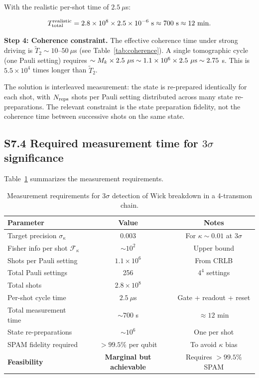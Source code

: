 \documentclass[prd,aps,showpacs,superscriptaddress,twocolumn]{revtex4-2}
\begin{document}
With the realistic per-shot time of $2.5\ \mu$s:

\begin{equation}
T_{\rm total}^{\rm realistic} = 2.8 \times 10^8 \times 2.5 \times 10^{-6}\ {\rm s} \approx 700\ {\rm s} \approx 12\ {\rm min}.
\label{eq:T_total_realistic}
\end{equation}

\textbf{Step 4: Coherence constraint.} The effective coherence time under strong driving is $\tilde{T}_2 \sim 10$--$50\ \mu$s (see Table~\ref{tab:coherence}). A single tomographic cycle (one Pauli setting) requires $\sim M_k \times 2.5\ \mu{\rm s} \sim 1.1 \times 10^6 \times 2.5\ \mu{\rm s} \sim 2.75$ s. This is $5.5 \times 10^4$ times longer than $\tilde{T}_2$.

The solution is interleaved measurement: the state is re-prepared identically for each shot, with $N_{\rm reps}$ shots per Pauli setting distributed across many state re-preparations. The relevant constraint is the state preparation fidelity, not the coherence time between successive shots on the same state.

\subsection{S7.4 Required measurement time for $3\sigma$ significance}

Table~\ref{tab:qubit_3sigma} summarizes the measurement requirements.

\begin{table}[h]
\centering
\caption{Measurement requirements for $3\sigma$ detection of Wick breakdown in a 4-transmon chain.}
\label{tab:qubit_3sigma}
\begin{tabular}{lcc}
\toprule
\textbf{Parameter} & \textbf{Value} & \textbf{Notes} \\
\midrule
Target precision $\sigma_\kappa$ & 0.003 & For $\kappa \sim 0.01$ at $3\sigma$ \\
Fisher info per shot $\mathcal{F}_\kappa$ & $\sim 10^2$ & Upper bound \\
Shots per Pauli setting & $1.1 \times 10^6$ & From CRLB \\
Total Pauli settings & 256 & $4^4$ settings \\
Total shots & $2.8 \times 10^8$ & \\
Per-shot cycle time & $2.5\ \mu$s & Gate + readout + reset \\
Total measurement time & $\sim 700$ s & $\approx 12$ min \\
State re-preparations & $\sim 10^6$ & One per shot \\
SPAM fidelity required & $> 99.5\%$ per qubit & To avoid $\kappa$ bias \\
\midrule
\textbf{Feasibility} & \textbf{Marginal but achievable} & Requires $> 99.5\%$ SPAM \\
\bottomrule
\end{tabular}
\end{table}
\end{document}
